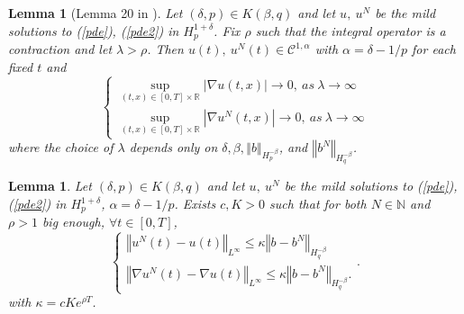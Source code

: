 \documentclass[11pt]{article}
\newtheorem{lem}[theo]{Lemma}
\newcommand{\norme}[1]{\left\Vert #1\right\Vert}
\newcommand{\R}{\mathbb{R}}
\newcommand{\N}{\mathbb{N}}
\begin{document}
    \begin{lem}[Lemma 20 in \cite{Fla-Iss-Rus-2017}]\label{lem}
        Let $(\delta,p)\in K(\beta,q)$ and let $u,\ u^N$ be the mild solutions to (\ref{pde}), (\ref{pde2}) in $H_p^{1+\delta}$. Fix $\rho$ such that the integral operator is a contraction and let $\lambda>\rho$. Then $u(t),\ u^N(t)\in\mathcal{C}^{1,\alpha}$ with $\alpha=\delta-1/p$ for each fixed $t$ and 
        \begin{equation*}
        \begin{cases}
        \underset{(t,x)\in[0,T]\times\R}{\sup} |\nabla u(t,x)| \rightarrow 0,\ as\ \lambda \rightarrow \infty \\
        \underset{(t,x)\in[0,T]\times\R}{\sup} |\nabla u^N(t,x)| \rightarrow 0,\ as\ \lambda \rightarrow \infty
        \end{cases}
        \end{equation*}
        where the choice of $\lambda$ depends only on $\delta,\beta,\norme{b}_{H_p^{-\beta}}$, and $\norme{b^N}_{H_q^{-\beta}}$.
    \end{lem}
    
    \begin{lem}\label{morrey} Let $(\delta,p)\in K(\beta,q)$ and let $u,\ u^N$ be the mild solutions to (\ref{pde}),(\ref{pde2}) in $H_p^{1+\delta}$, $\alpha = \delta - 1/p$. Exists $c,K>0$ such that for both $N\in\N$ and $\rho>1$ big enough, $\forall t\in[0,T]$,
        \begin{equation}
        \begin{cases}
        \norme{u^N(t) - u(t)}_{L^\infty}\leq \kappa\norme{b-b^N}_{H^{-\beta}_{q}}\\        
        \norme{\nabla u^N(t) - \nabla u(t)}_{L^\infty}\leq \kappa \norme{b-b^N}_{H^{-\beta}_{q}}.
        \end{cases} .
        \end{equation}
        with $\kappa = c Ke^{\rho T}$.
    \end{lem}    
    
\end{document}
